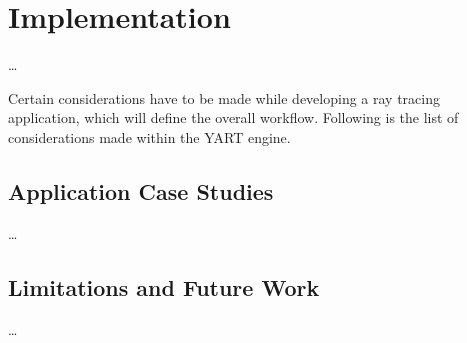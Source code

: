 \chapter{Implementation} \label{ch:Implementation}

\dots

Certain considerations have to be made while developing a ray tracing application, which will define the overall workflow. Following is the list of considerations made within the YART engine. 

\section{Application Case Studies}

\dots


\section{Limitations and Future Work}

\dots
